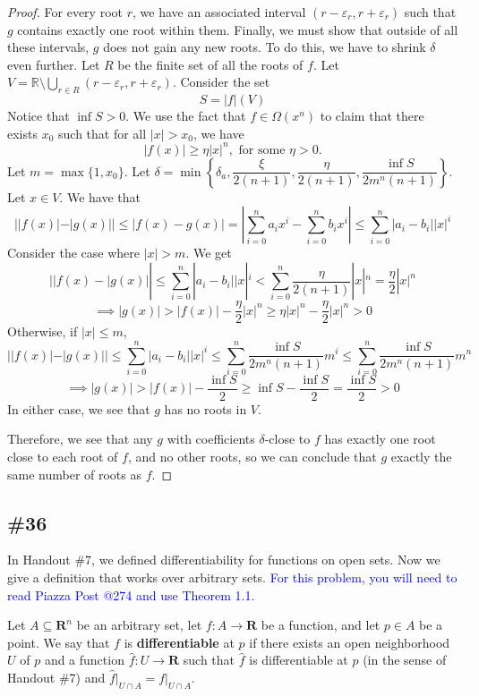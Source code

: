 \documentclass{article}
\newcommand{\R}{\mathbf{R}}
\theoremstyle{plain} %
\numberwithin{thm}{section} %
\theoremstyle{definition}
\begin{document}
\begin{proof}
    For every root \(r\), we have an associated interval \((r - \varepsilon _r, r + \varepsilon _r)\) such that \(g\) contains exactly one root within them. Finally, we must show that outside of all these intervals, \(g\) does not gain any new roots. To do this, we have to shrink \(\delta\) even further. Let \(R\) be the finite set of all the roots of \(f\). Let \(V = \mathbb{R}\setminus \bigcup_{r \in R} (r - \varepsilon_r, r + \varepsilon _r)\). Consider the set
    \[
        S = |f|(V)
    \]
    Notice that \(\inf S > 0\). We use the fact that \(f \in \Omega (x^n)\) to claim that there exists \(x_0\) such that for all \(|x| > x_0\), we have
    \[
        |f(x)| \geq \eta |x|^n, \text{ for some } \eta > 0.
    \]
    Let \(m = \max \{1, x_0\}\). Let \(\delta = \min \left\{ \delta_a, \dfrac{\xi}{2(n+1)}, \dfrac{\eta}{2(n+1)}, \dfrac{\inf S}{2m^n(n+1)} \right\}\). Let \(x \in V\). We have that
    \[
        ||f(x)| - |g(x)|| \leq |f(x) - g(x)| = \left\vert \sum_{i=0}^{n} a_i x^i - \sum_{i=0}^{n} b_i x^i \right\vert \leq \sum_{i=0}^{n} |a_i - b_i| |x|^i
    \]
    Consider the case where \(|x| > m\). We get
    \[
        | |f(x) - |g(x)| | \leq \sum_{i=0}^{n} |a_i - b_i| |x|^i < \sum_{i=0}^{n} \frac{\eta}{2(n+1)} |x|^n = \frac{\eta}{2}|x|^n
    \]
    \[
        \implies |g(x)| > |f(x)| - \frac{\eta}{2}|x|^n \geq \eta |x|^n - \frac{\eta}{2}|x|^n > 0
    \]
    Otherwise, if \(|x| \leq m\),
    \[
        | |f(x)| - |g(x)| | \leq \sum_{i=0}^{n} |a_i - b_i| |x|^i \leq \sum_{i=0}^{n} \frac{\inf S}{2m^n(n+1)}m^i \leq \sum_{i=0}^{n} \frac{\inf S}{2m^n(n+1)}m^n
    \]
    \[
        \implies |g(x)| > |f(x)| - \frac{\inf S}{2} \geq \inf S - \frac{\inf S}{2} = \frac{\inf S}{2} > 0
    \]
    In either case, we see that \(g\) has no roots in \(V\).

    Therefore, we see that any \(g\) with coefficients \(\delta\)-close to \(f\) has exactly one root close to each root of \(f\), and no other roots, so we can conclude that \(g\) exactly the same number of roots as \(f\).
        \end{proof}
        \newpage
        \subsection{\#36}
        In Handout \#7, we defined differentiability for functions on open sets. Now we give a definition that works over arbitrary sets. \textcolor{blue}{For this problem, you will need to read Piazza Post @274 and use Theorem 1.1.}
    
        Let $A\subseteq \R^n$ be an arbitrary set, let $f:A\rightarrow \R$ be a function, and let $p\in A$ be a point. We say that $f$ is \textbf{differentiable} at $p$ if there exists an open neighborhood $U$ of $p$ and a function $\widehat{f}:U\rightarrow \R$ such that $\widehat{f}$ is differentiable at $p$ (in the sense of Handout \#7) and $\widehat{f}\vert_{U\cap A}=f\vert_{U\cap A}$.
\end{document}
